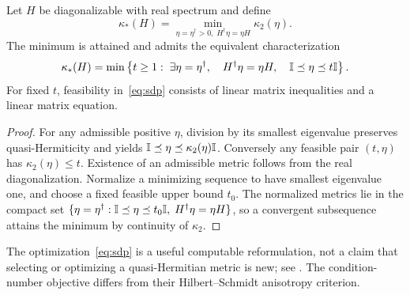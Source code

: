 \begin{proposition}
\label{prop:sdp}
Let $H$ be diagonalizable with real spectrum and define
\begin{equation}\label{eq:kappastar}
 \kappa_*(H)=\min_{\eta=\eta^\dagger>0,\;H^\dagger\eta=\eta H}
 \kappa_2(\eta).
\end{equation}
The minimum is attained and admits the equivalent characterization
\begin{equation}\label{eq:sdp}
 \kappa_*(H)=\min\left\{t\geq1:\;\exists\eta=\eta^\dagger,
 \quad H^\dagger\eta=\eta H,\quad
 \mathbb{I}\preceq\eta\preceq t\mathbb{I}\right\}.
\end{equation}
For fixed $t$, feasibility in~\eqref{eq:sdp} consists of linear matrix
inequalities and a linear matrix equation.
\end{proposition}
\begin{proof}
For any admissible positive $\eta$, division by its smallest eigenvalue
preserves quasi-Hermiticity and yields $\mathbb{I}\preceq\eta\preceq
\kappa_2(\eta)\mathbb{I}$. Conversely any feasible pair $(t,\eta)$ has
$\kappa_2(\eta)\leq t$. Existence of an admissible metric follows from
the real diagonalization. Normalize a minimizing sequence to have smallest
eigenvalue one, and choose a fixed feasible upper bound $t_0$.
The normalized metrics lie in the compact set
$\{\eta=\eta^\dagger:\mathbb{I}\preceq\eta\preceq t_0\mathbb{I},\;
 H^\dagger\eta=\eta H\}$, so a convergent subsequence attains the
minimum by continuity of $\kappa_2$.
\end{proof}
\begin{remark}
The optimization~\eqref{eq:sdp} is a useful computable reformulation, not
a claim that selecting or optimizing a quasi-Hermitian metric is new; see
\cite{Krejcirik2018}. The condition-number objective differs from their
Hilbert--Schmidt anisotropy criterion.
\end{remark}
